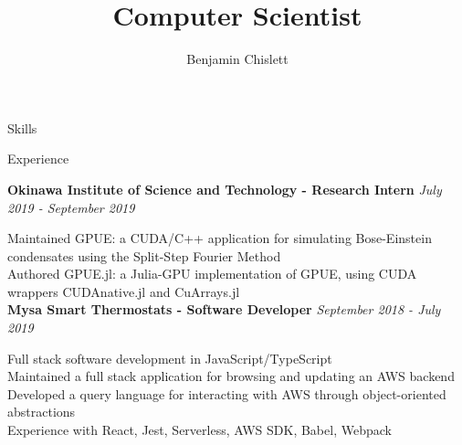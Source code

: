 \documentclass[11pt, letterpaper]{article}
\title{Computer Scientist}
\author{Benjamin Chislett}
\date{}
\begin{document}
\begin{center}
  \Huge\theauthor
  \par
  \huge\thetitle
  \par
\end{center}

\begin{section}{Skills}

\end{section}

\begin{section}{Experience}

\textbf{Okinawa Institute of Science and Technology - Research Intern}
\hfill
\textit{July 2019 - September 2019}

Maintained GPUE: a CUDA/C++ application for simulating Bose-Einstein condensates using the Split-Step Fourier Method\\
Authored GPUE.jl: a Julia-GPU implementation of GPUE, using CUDA wrappers CUDAnative.jl and CuArrays.jl\\

\textbf{Mysa Smart Thermostats - Software Developer}
\hfill
\textit{September 2018 - July 2019}

Full stack software development in JavaScript/TypeScript\\
Maintained a full stack application for browsing and updating an AWS backend\\
Developed a query language for interacting with AWS through object-oriented abstractions\\
Experience with React, Jest, Serverless, AWS SDK, Babel, Webpack\\
\end{section}
\end{document}
